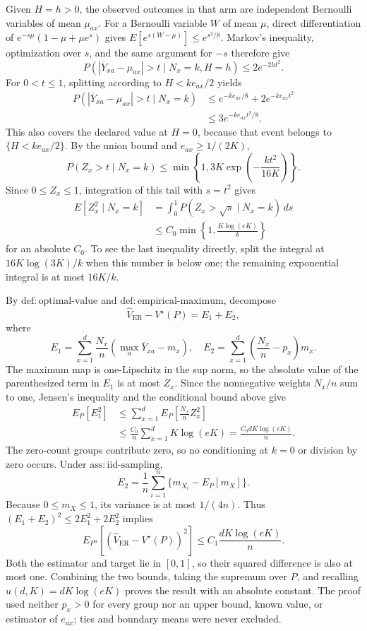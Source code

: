 Given \(H=h>0\), the observed outcomes in that arm are independent Bernoulli variables of mean \(\mu_{ax}\).  For a Bernoulli variable \(W\) of mean \(\mu\), direct differentiation of
\(e^{-s\mu}(1-\mu+\mu e^s)\) gives
\(E[e^{s(W-\mu)}]\leq e^{s^2/8}\).  Markov's inequality, optimization over \(s\), and the same argument for \(-s\) therefore give
\[
 P(|\overline Y_{xa}-\mu_{ax}|>t\mid N_x=k,H=h)
 \leq2e^{-2ht^2}.
\]
For \(0<t\leq1\), splitting according to \(H<ke_{ax}/2\) yields
\[
 \begin{aligned}
 P(|\overline Y_{xa}-\mu_{ax}|>t\mid N_x=k)
 &\leq e^{-ke_{ax}/8}+2e^{-ke_{ax}t^2}\\
 &\leq3e^{-ke_{ax}t^2/8}.
 \end{aligned}
\]
This also covers the declared value at \(H=0\), because that event belongs to \(\{H<ke_{ax}/2\}\).  By the union bound and \(e_{ax}\geq1/(2K)\),
\[
 P(Z_x>t\mid N_x=k)
 \leq\min\left\{1,3K\exp\!\left(-\frac{kt^2}{16K}\right)\right\}.
\]
Since \(0\leq Z_x\leq1\), integration of this tail with \(s=t^2\) gives
\[
 \begin{aligned}
 E[Z_x^2\mid N_x=k]
 &=\int_0^1P(Z_x>\sqrt s\mid N_x=k)\,ds\\
 &\leq C_0\min\left\{1,\frac{K\log(eK)}k\right\}
 \end{aligned}
\]
for an absolute \(C_0\).  To see the last inequality directly, split the integral at
\(16K\log(3K)/k\) when this number is below one; the remaining exponential integral is at most \(16K/k\).

By \(\mathrm{def{:}optimal\text{-}value}\) and \(\mathrm{def{:}empirical\text{-}maximum}\), decompose
\[
 \widehat V_{\mathrm{ER}}-V^\star(P)=E_1+E_2,
\]
where
\[
 E_1=\sum_{x=1}^d\frac{N_x}{n}
 \left(\max_a\overline Y_{xa}-m_x\right),
 \quad
 E_2=\sum_{x=1}^d\left(\frac{N_x}{n}-p_x\right)m_x.
\]
The maximum map is one-Lipschitz in the sup norm, so the absolute value of the parenthesized term in \(E_1\) is at most \(Z_x\).  Since the nonnegative weights \(N_x/n\) sum to one, Jensen's inequality and the conditional bound above give
\[
 \begin{aligned}
 E_P[E_1^2]
 &\leq\sum_{x=1}^d E_P\left[\frac{N_x}{n}Z_x^2\right]\\
 &\leq\frac{C_0}{n}\sum_{x=1}^d K\log(eK)
 =\frac{C_0dK\log(eK)}n.
\end{aligned}
\]
The zero-count groups contribute zero, so no conditioning at \(k=0\) or division by zero occurs.  Under \(\mathrm{ass{:}iid\text{-}sampling}\),
\[
 E_2=\frac1n\sum_{i=1}^n\{m_{X_i}-E_P[m_X]\}.
\]
Because \(0\leq m_X\leq1\), its variance is at most \(1/(4n)\).  Thus \((E_1+E_2)^2\leq2E_1^2+2E_2^2\) implies
\[
 E_{P^n}[(\widehat V_{\mathrm{ER}}-V^\star(P))^2]
 \leq C_1\frac{dK\log(eK)}n.
\]
Both the estimator and target lie in \([0,1]\), so their squared difference is also at most one.  Combining the two bounds, taking the supremum over \(P\), and recalling \(u(d,K)=dK\log(eK)\) proves the result with an absolute constant.  The proof used neither \(p_x>0\) for every group nor an upper bound, known value, or estimator of \(e_{ax}\); ties and boundary means were never excluded.

